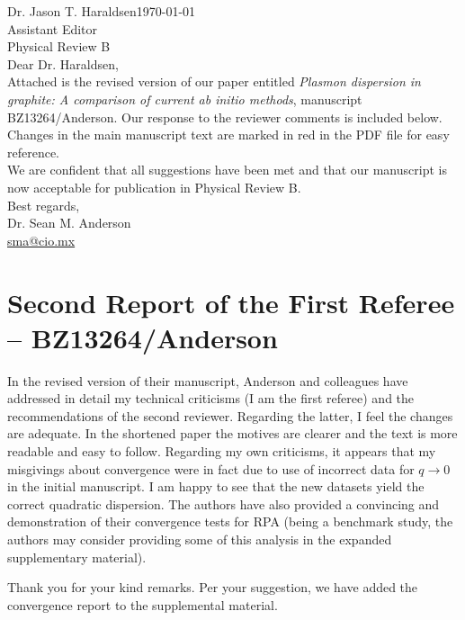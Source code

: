 \documentclass[aps,prb,10pt,endfloats]{revtex4-1}
\begin{document}
\noindent Dr. Jason T. Haraldsen\hfill{\today}\\
Assistant Editor\\
Physical Review B\\

\noindent Dear Dr. Haraldsen,\\

Attached is the revised version of our paper entitled \emph{Plasmon dispersion
in graphite: A comparison of current ab initio methods}, manuscript
BZ13264/Anderson. Our response to the reviewer comments is included below.
Changes in the main manuscript text are marked in red in the PDF file for easy
reference.\\

We are confident that all suggestions have been met and that our manuscript is
now acceptable for publication in Physical Review B.\\

\noindent Best regards,\\

\noindent Dr. Sean M. Anderson\\
\href{mailto:sma@cio.mx}{sma@cio.mx}


\section{Second Report of the First Referee -- BZ13264/Anderson}

In the revised version of their manuscript, Anderson and colleagues have
addressed in detail my technical criticisms (I am the first referee) and the
recommendations of the second reviewer. Regarding the latter, I feel the changes
are adequate. In the shortened paper the motives are clearer and the text is
more readable and easy to follow. Regarding my own criticisms, it appears that
my misgivings about convergence were in fact due to use of incorrect data for
$q\rightarrow 0$ in the initial manuscript. I am happy to see that the new
datasets yield the correct quadratic dispersion. The authors have also provided
a convincing and demonstration of their convergence tests for RPA (being a
benchmark study, the authors may consider providing some of this analysis in the
expanded supplementary material).
\begin{shaded*}
Thank you for your kind remarks. Per your suggestion, we have added the
convergence report to the supplemental material.
\end{shaded*}
\end{document}
